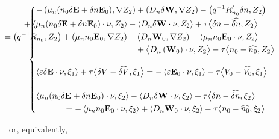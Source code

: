 \documentclass[a4paper,12pt, draft]{article}
\begin{document}
\begin{equation*}
\begin{cases}
\begin{aligned}
  - \left(\mu_n (n_{0} \delta \mathbf{E} + \delta n \mathbf{E}_{0}), \nabla Z_{2} \right) + \left(
          D_n  \delta \mathbf{W}, \nabla Z_{2} \right)-\left({q^{-1}}R_{n_0}'\delta n, Z_2\right) \\
      & \hspace{-290pt} + \left<\mu_n (n_{0} \delta \mathbf{E} +
          \delta n \mathbf{E}_{0}) \cdot \nu, Z_{2} \right>  - \left< D_n \delta \mathbf{W} \cdot
          \nu, Z_{2} \right> + \tau \big< \delta n - \widehat{\delta n}, Z_{2} \big> \\
      & \hspace{-314pt} = \left({q^{-1}}R_{n_0}, Z_2\right) + \left(\mu_n n_{0}
          \mathbf{E}_{0}, \nabla Z_{2} \right) - \left(D_n\mathbf{W}_{0}, \nabla Z_{2} \right) -
          \left<\mu_n n_{0} \mathbf{E}_{0} \cdot \nu, Z_{2} \right> \\
      & \hspace{-155pt} + \big< D_n
          \left( \mathbf{W}_{0} \right) \cdot \nu, Z_{2} \big> - \tau \big< n_{0} -
          \widehat{n_{0}}, Z_{2} \big>
  \end{aligned} \\[35pt]
  \begin{aligned}
  \left<\varepsilon \delta \mathbf{E} \cdot \nu, \xi_{1}\right> +
      \tau \big< \delta V - \widehat{\delta V}, \xi_{1} \big> =
      -\left<\varepsilon \mathbf{E}_{0} \cdot \nu, \xi_{1}\right> - \tau \big< V_{0} -
      \widehat{V_{0}} , \xi_{1} \big>
  \end{aligned} \\[15pt]
  \begin{aligned}
  \left<\mu_n (n_{0} \delta \mathbf{E} + \delta n \mathbf{E}_{0}) \cdot \nu, \xi_{2} \right> -
      \left<D_n \delta \mathbf{W} \cdot \nu, \xi_{2} \right> + \tau \big< \delta n -
      \widehat{\delta n}, \xi_{2} \big> \\
  & \hspace{-228pt} = - \left<\mu_n n_{0} \mathbf{E}_{0} \cdot \nu, \xi_{2} \right> + \left<D_n
      \mathbf{W}_{0} \cdot \nu, \xi_{2} \right> - \tau \big< n_{0} - \widehat{n_{0}}, \xi_{2} \big>
  \end{aligned}
 \end{cases}
\end{equation*}

or, equivalently,
\end{document}
